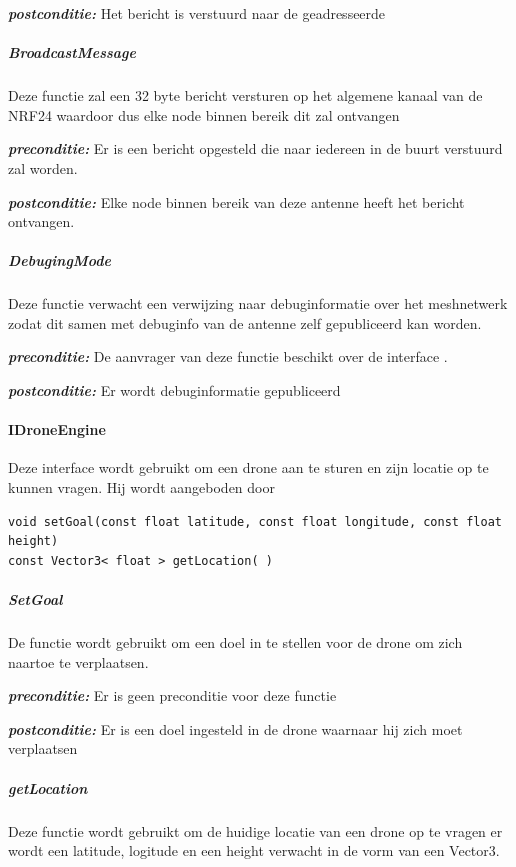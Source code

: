 \documentclass[a4paper, 11pt, oneside]{report}
\begin{document}
\textbf{\textit{postconditie:}} Het bericht is verstuurd naar de geadresseerde

\subparagraph{BroadcastMessage}
\label{DetailedDesign:ros:extern:interfaces:IWirelessCommunication:BroadcastMessage}
Deze functie zal een 32 byte bericht versturen op het algemene kanaal van de NRF24 waardoor dus elke node binnen bereik dit zal ontvangen

\textbf{\textit{preconditie:}} Er is een bericht opgesteld die naar iedereen in de buurt verstuurd zal worden.

\textbf{\textit{postconditie:}} Elke node binnen bereik van deze antenne heeft het bericht ontvangen.


\subparagraph{DebugingMode}
\label{DetailedDesign:ros:extern:interfaces:IWirelessCommunication:DebuggingMode}
Deze functie verwacht een verwijzing naar debuginformatie over het meshnetwerk zodat dit samen met debuginfo van de antenne zelf gepubliceerd kan worden.

\textbf{\textit{preconditie:}} De aanvrager van deze functie beschikt over de interface .

\textbf{\textit{postconditie:}} Er wordt debuginformatie gepubliceerd



\paragraph{IDroneEngine}
\label{DetailedDesign:ros:extern:interfaces:IDroneEngine}
Deze interface wordt gebruikt om een drone aan te sturen en zijn locatie op te kunnen vragen. Hij wordt aangeboden door 

\begin{lstlisting}
void setGoal(const float latitude, const float longitude, const float height)
const Vector3< float > getLocation( )
\end{lstlisting}

\subparagraph{SetGoal}
\label{DetailedDesign:ros:extern:interfaces:IDroneEngine:SetGoal}
De functie wordt gebruikt om een doel in te stellen voor de drone om zich naartoe te verplaatsen.

\textbf{\textit{preconditie:}} Er is geen preconditie voor deze functie 

\textbf{\textit{postconditie:}} Er is een doel ingesteld in de drone waarnaar hij zich moet verplaatsen


\subparagraph{getLocation}
\label{DetailedDesign:ros:extern:interfaces:IDroneEngine:getLocation}
Deze functie wordt gebruikt om de huidige locatie van een drone op te vragen er wordt een latitude, logitude en een height verwacht in de vorm van een Vector3.
\end{document}
